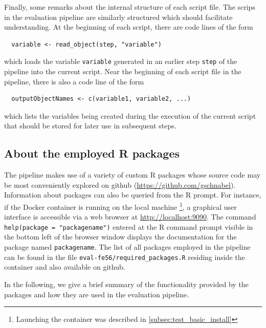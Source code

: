 \documentclass[12pt,a4paper]{scrartcl}
\begin{document}
Finally, some remarks about the internal structure of each script file.
The scrips in the evaluation pipeline are similarly structured which should facilitate understanding.
 At the beginning of each script, there are code lines of the form
\begin{verbatim}
  variable <- read_object(step, "variable")
\end{verbatim}
which loads the variable \verb#variable# generated in an earlier step \verb#step# of the pipeline into the current script.
Near the beginning of each script file in the pipeline, there is also a code line of the form
\begin{verbatim}
  outputObjectNames <- c(variable1, variable2, ...)
\end{verbatim}
which lists the variables being created during the execution of the current script that should be stored for later use in subsequent steps.
 
 \subsection{About the employed R packages}
 The pipeline makes use of a variety of custom R packages whose source code may be most conveniently explored on github (\url{https://github.com/gschnabel}).
 Information about packages can also be queried from the R prompt.
 For instance, if the Docker container is running on the local machine \footnote{Launching the container was described in \cref{subsec:test_basic_install}}, a graphical user interface is accessible via a web browser at \url{http://localhost:9090}.
 The command \verb#help(package = "packagename")# entered at the R command prompt visible in the bottom left of the browser window displays the documentation for the package named \verb#packagename#.
 The list of all packages employed in the pipeline can be found in the file \verb#eval-fe56/required_packages.R# residing inside the container and also available on github.
 
 In the following, we give a brief summary of the functionality provided by the packages and how they are used in the evaluation pipeline.
 
\end{document}
